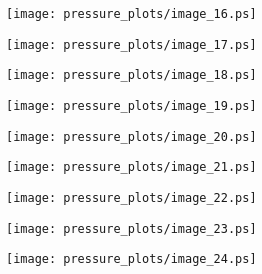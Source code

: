 \documentclass[11pt]{amsart}
\theoremstyle{plain}%
\theoremstyle{definition}
\theoremstyle{remark}
\numberwithin{equation}{thm}
\begin{document}
\begin{figure}[H]
\begin{center}
\texttt{[image: pressure\_plots/image\_16.ps]} 
\end{center}
\end{figure}

\begin{figure}[H]
\begin{center}
\texttt{[image: pressure\_plots/image\_17.ps]} 
\end{center}
\end{figure}

\begin{figure}[H]
\begin{center}
\texttt{[image: pressure\_plots/image\_18.ps]} 
\end{center}
\end{figure}

\begin{figure}[H]
\begin{center}
\texttt{[image: pressure\_plots/image\_19.ps]} 
\end{center}
\end{figure}

\begin{figure}[H]
\begin{center}
\texttt{[image: pressure\_plots/image\_20.ps]} 
\end{center}
\end{figure}

\begin{figure}[H]
\begin{center}
\texttt{[image: pressure\_plots/image\_21.ps]} 
\end{center}
\end{figure}

\begin{figure}[H]
\begin{center}
\texttt{[image: pressure\_plots/image\_22.ps]} 
\end{center}
\end{figure}

\begin{figure}[H]
\begin{center}
\texttt{[image: pressure\_plots/image\_23.ps]} 
\end{center}
\end{figure}

\begin{figure}[H]
\begin{center}
\texttt{[image: pressure\_plots/image\_24.ps]} 
\end{center}
\end{figure}
\end{document}
